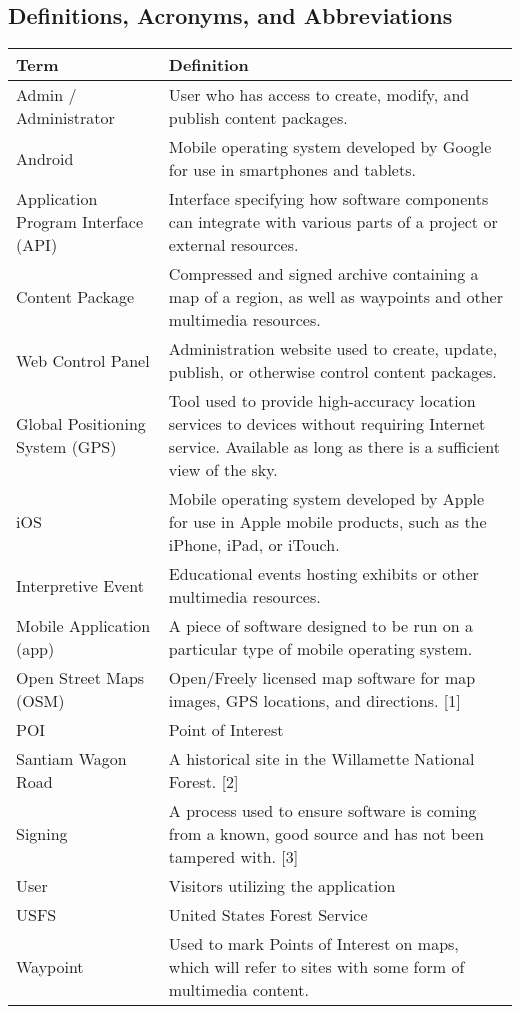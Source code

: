 \documentclass[letterpaper, 10pt,titlepage]{article}
\begin{document}
\subsection{Definitions, Acronyms, and Abbreviations }
\begin{table}[ht]
\begin{tabular}{| l | p{9cm} |}
\hline
\textbf{Term} & \textbf{Definition} \\ \hline
Admin / Administrator & User who has access to create, modify, and publish content packages. \\ \hline
Android & Mobile operating system developed by Google for use in smartphones and tablets. \\ \hline
Application Program Interface (API) & Interface specifying how software components can integrate with various parts of a project or external resources. \\ \hline
Content Package & Compressed and signed archive containing a map of a region, as well as waypoints and other multimedia resources. \\ \hline
Web Control Panel & Administration website used to create, update, publish, or otherwise control content packages. \\ \hline
Global Positioning System (GPS) & Tool used to provide high-accuracy location services to devices without requiring Internet service. Available as long as there is a sufficient view of the sky. \\ \hline
iOS & Mobile operating system developed by Apple for use in Apple mobile products, such as the iPhone, iPad, or iTouch. \\ \hline
Interpretive Event & Educational events hosting exhibits or other multimedia resources. \\ \hline
Mobile Application (app) & A piece of software designed to be run on a particular type of mobile operating system. \\ \hline
Open Street Maps (OSM) & Open/Freely licensed map software for map images, GPS locations, and directions. {[}1{]} \\ \hline
POI & Point of Interest \\ \hline
Santiam Wagon Road & A historical site in the Willamette National Forest. [2] \\ \hline
Signing & A process used to ensure software is coming from a known, good source and has not been tampered with. [3]\\ \hline
User & Visitors utilizing the application \\ \hline
USFS & United States Forest Service \\ \hline
Waypoint & Used to mark Points of Interest on maps, which will refer to sites with some form of multimedia content. \\ \hline
\end{tabular}
\end{table}                                                
\end{document}
